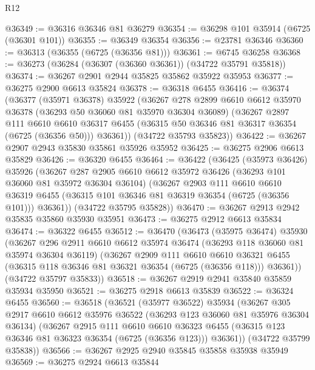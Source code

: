 \begin{lexlean}{R12}
\begin{coremodule}
@36349 := @36316 @36346 @81 @36279
@36354 := @36298 @101 @35914 (@6725 (@36301 @101))
@36355 := @36349 @36354
@36356 := @23781 @36346
@36360 := @36313 (@36355 (@6725 (@36356 @81)))
@36361 := @6745 @36258
@36368 := @36273 (@36284 (@36307 (@36360 @36361)) (@34722 @35791 @35818))
@36374 := @36267 @2901 @2944 @35825 @35862 @35922 @35953
@36377 := @36275 @2900 @6613 @35824
@36378 := @36318 @6455
@36416 := @36374
    (@36377
      (@35971 @36378)
      @35922
      (@36267
        @278
        @2899
        @6610
        @6612
        @35970
        @36378
        (@36293 @50 @36060 @81 @35970 @36304 @36089)
        (@36267
          @2897
          @111
          @6610
          @6610
          @36317
          @6455
          (@36315 @50 @36346 @81 @36317 @36354 (@6725 (@36356 @50)))
          @36361))
      (@34722 @35793 @35823))
@36422 := @36267 @2907 @2943 @35830 @35861 @35926 @35952
@36425 := @36275 @2906 @6613 @35829
@36426 := @36320 @6455
@36464 := @36422
    (@36425
      (@35973 @36426)
      @35926
      (@36267
        @287
        @2905
        @6610
        @6612
        @35972
        @36426
        (@36293 @101 @36060 @81 @35972 @36304 @36104)
        (@36267
          @2903
          @111
          @6610
          @6610
          @36319
          @6455
          (@36315 @101 @36346 @81 @36319 @36354 (@6725 (@36356 @101)))
          @36361))
      (@34722 @35795 @35828))
@36470 := @36267 @2913 @2942 @35835 @35860 @35930 @35951
@36473 := @36275 @2912 @6613 @35834
@36474 := @36322 @6455
@36512 := @36470
    (@36473
      (@35975 @36474)
      @35930
      (@36267
        @296
        @2911
        @6610
        @6612
        @35974
        @36474
        (@36293 @118 @36060 @81 @35974 @36304 @36119)
        (@36267
          @2909
          @111
          @6610
          @6610
          @36321
          @6455
          (@36315 @118 @36346 @81 @36321 @36354 (@6725 (@36356 @118)))
          @36361))
      (@34722 @35797 @35833))
@36518 := @36267 @2919 @2941 @35840 @35859 @35934 @35950
@36521 := @36275 @2918 @6613 @35839
@36522 := @36324 @6455
@36560 := @36518
    (@36521
      (@35977 @36522)
      @35934
      (@36267
        @305
        @2917
        @6610
        @6612
        @35976
        @36522
        (@36293 @123 @36060 @81 @35976 @36304 @36134)
        (@36267
          @2915
          @111
          @6610
          @6610
          @36323
          @6455
          (@36315 @123 @36346 @81 @36323 @36354 (@6725 (@36356 @123)))
          @36361))
      (@34722 @35799 @35838))
@36566 := @36267 @2925 @2940 @35845 @35858 @35938 @35949
@36569 := @36275 @2924 @6613 @35844

\end{coremodule}
\end{lexlean}
